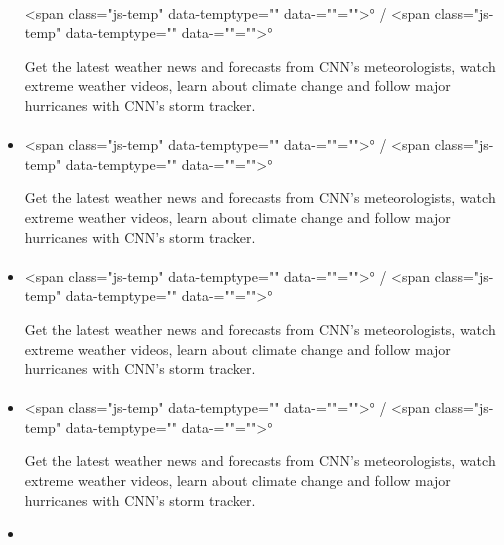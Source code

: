 \begin{itemize}
{  \paragraph{}\label{section-2}}

  \textless span class="js-temp" data-temptype=""
  data-=""=""\textgreater{}° / \textless span class="js-temp"
  data-temptype="" data-=""=""\textgreater{}°

  Get the latest weather news and forecasts from CNN's meteorologists,
  watch extreme weather videos, learn about climate change and follow
  major hurricanes with CNN's storm tracker.
\item
  \hypertarget{section-3}{%
  \paragraph{}\label{section-3}}

  \textless span class="js-temp" data-temptype=""
  data-=""=""\textgreater{}° / \textless span class="js-temp"
  data-temptype="" data-=""=""\textgreater{}°

  Get the latest weather news and forecasts from CNN's meteorologists,
  watch extreme weather videos, learn about climate change and follow
  major hurricanes with CNN's storm tracker.
\item
  \hypertarget{section-4}{%
  \paragraph{}\label{section-4}}

  \textless span class="js-temp" data-temptype=""
  data-=""=""\textgreater{}° / \textless span class="js-temp"
  data-temptype="" data-=""=""\textgreater{}°

  Get the latest weather news and forecasts from CNN's meteorologists,
  watch extreme weather videos, learn about climate change and follow
  major hurricanes with CNN's storm tracker.
\item
  \hypertarget{section-5}{%
  \paragraph{}\label{section-5}}

  \textless span class="js-temp" data-temptype=""
  data-=""=""\textgreater{}° / \textless span class="js-temp"
  data-temptype="" data-=""=""\textgreater{}°

  Get the latest weather news and forecasts from CNN's meteorologists,
  watch extreme weather videos, learn about climate change and follow
  major hurricanes with CNN's storm tracker.
\item
  \hypertarget{section-6}{%
}
\end{itemize}
